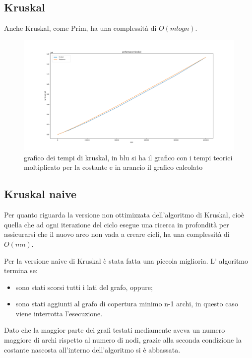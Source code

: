 \newpage

\subsection{Kruskal}
Anche Kruskal, come Prim, ha una complessità di $O(mlogn)$.

\begin{figure}[htbp]
    \centering
    \centerline{\includegraphics[scale = 0.38]{Fig/KruskalFinale.png}}
    \caption{grafico dei tempi di kruskal,  in blu si ha il grafico con i tempi teorici moltiplicato per la costante e in arancio il grafico calcolato}
    \label{Kruskal}
\end{figure}

\newpage
\subsection{Kruskal naive}
Per quanto riguarda la versione non ottimizzata dell'algoritmo di Kruskal, cioè quella che ad ogni iterazione del ciclo esegue una ricerca in profondità per assicurarsi che il nuovo arco non vada a creare cicli, ha una complessità di $O(mn)$.

Per la versione naive di Kruskal è stata fatta una piccola miglioria. L' algoritmo termina se:
\begin{itemize}
    \item sono stati scorsi tutti i lati del grafo, oppure;
    \item sono stati aggiunti al grafo di copertura minimo n-1 archi, in questo caso viene interrotta l'esecuzione.
\end{itemize}
Dato che la maggior parte dei grafi testati mediamente aveva un numero maggiore di archi rispetto al numero di nodi, grazie alla seconda condizione la costante nascosta all'interno dell'algoritmo si è abbassata. 


